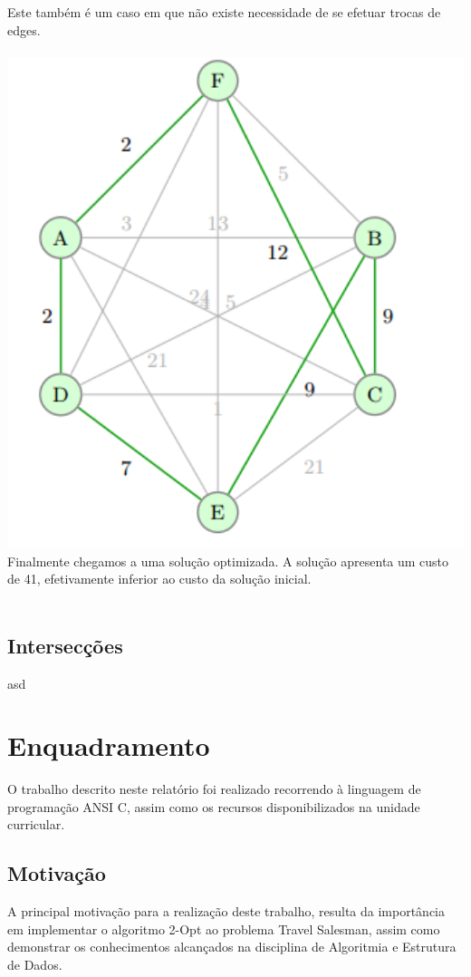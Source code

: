 \documentclass[12pt,a4paper,portrait]{article}
\begin{document}
			Este também é um caso em que não existe necessidade de se efetuar trocas de edges.\\\\
			\includegraphics[width=1.0\textwidth]{imagens/9}
			Finalmente chegamos a uma solução optimizada. A solução apresenta um custo de 41, efetivamente inferior ao custo da solução inicial.\\\\
			\newpage
			\subsection{Intersecções}
			asd
	\section{Enquadramento}
	O trabalho descrito neste relatório foi realizado recorrendo à linguagem de programação ANSI C, assim como os recursos disponibilizados na unidade curricular.\\
		\subsection{Motivação}
			A principal motivação para a realização deste trabalho, resulta da importância em implementar o algoritmo 2-Opt ao problema Travel Salesman, assim como demonstrar os conhecimentos alcançados na disciplina de Algoritmia e Estrutura de Dados.\\
\end{document}
